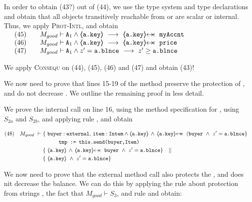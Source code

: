 \begin{proofO}
In order to obtain (43?) out of (44), we use the type system and type declarations and obtain that all objects transitively reachable from
 or  are scalar or internal. Thus, we 
apply \textsc{Prot-Intl}, %
and obtain\\
$
\begin{array}{llll}
& (45) & & M_{good} \vdash \Alocalsb \wedge  {\inside{\prg{a.key}}}\  \longrightarrow\ \protectedFrom {\prg{a.key}} {\prg{myAccnt}} 
\\
& (46) & & M_{good} \vdash \Alocalsb \wedge  {\inside{\prg{a.key}}}\  \longrightarrow\ \protectedFrom {\prg{a.key}} {\prg{price}} 
\\
& (47) & & M_{good} \vdash \Alocalsb \wedge  z'= \prg{a.\balance}\   \longrightarrow\  z'\geq \prg{a.\balance} 
\end{array}
$

We apply {\textsc{Consequ}} on (44), (45), (46) and (47) and obtain (43)!

\normalsize


 We now need to prove that lines 15-19 of the method preserve the protection of , and do not decrease .
 We outline the  remaining proof in less detail.
 
 We prove the internal call on line 16, using the method specification for , using $S_{2a}$ and $S_{2b}$, and applying rule {}, and obtain

 \small
\begin{align*}
\text{(48)} \ \ \ M_{good}\  \vdash \ & \{ \ \prg{buyer}:\prg{external},\, \prg{item}:\prg{Intem} \wedge {\inside{\prg{a.key}}} \, \wedge\, 
\protectedFrom {\prg{a.key}} {(\prg{buyer}}  \  \wedge\ z'= \prg{a.\balance}  \} \\
		  		& \SPT  \prg{tmp := this.send(buyer,Item)}\ \\  
		  		& \{ \ \inside{\prg{a.key}} \, \wedge\, 
\protectedFrom {\prg{a.key}} {\prg{buyer}} \ \wedge\ z'= \prg{a.\balance}  \} \ \ \  || \ \ \  \\
		  		&   \{ \   {\inside{\prg{a.key}}}\  \wedge\ z'= \prg{a.\balance}  \}
\end{align*}
\normalsize  
 

We now need to prove that the external method call  also protects the , and does nit decrease the balance. We can do this by applying the rule about protection from strings  {}, the fact that $M_{good} \vdash S_{3}$, and rule  {} and obtain:



\end{proofO}

